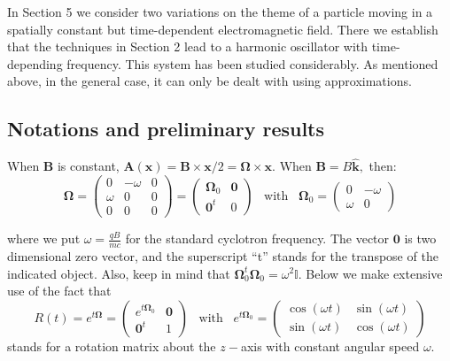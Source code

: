 \documentclass[12pt]{article}
\numberwithin{equation}{section}
\newcommand{\bOm}{{\boldsymbol \Omega}}
\def\b1{{\mathbf 1}}
\def\b0{{\mathbf 0}}
\def\bA{{\boldsymbol A}}
\def\bB{{\boldsymbol B}}
\def\bk{{\boldsymbol k}}
\def\bx{{\boldsymbol x}}
\def\bbI{{\mathbb I}}
\begin{document}
 In Section 5 we consider two variations on the theme of a particle moving in a spatially constant but time-dependent electromagnetic field.  There we establish that the techniques in Section 2 lead to a harmonic oscillator with time-depending frequency. This system has been studied considerably.  As mentioned above, in the general case, it can only be dealt with using approximations.

\subsection{Notations and preliminary results}
When $\bB$ is constant, $\bA(\bx)=\bB\times\bx/2 =\bOm\times\bx.$  When $\bB=B\hat{\bk},$  then:
\begin{equation}\label{ang1}
\bOm = \begin{pmatrix}0 & -\omega &0 \\
                \omega & 0 & 0\\
								0 & 0 & 0
				\end{pmatrix} = \begin{pmatrix} \bOm_0 & \b0\\	
			\b0^t & 0\end{pmatrix}\;\;\;\mbox{with}\;\;\;\bOm_0=\begin{pmatrix} 0 & -\omega\\
				                                 \omega & 0\end{pmatrix}
\end{equation}	
			
where we put $\omega=\frac{qB}{mc}$ for the standard cyclotron frequency. The vector $\b0$ is two dimensional zero vector, and the superscript ``t'' stands for the transpose of the indicated object. Also, keep in mind that $\bOm_0^t\bOm_0=\omega^2\bbI.$ Below we make extensive use of the fact that
\begin{equation}\label{rot1}
R(t) = e^{t\bOm} = \begin{pmatrix}e^{t \bOm_0} & \b0\\	
			\b0^t & 1\end{pmatrix}\;\;\;\mbox{with}\;\;\;
			e^{t\bOm_0}=\begin{pmatrix} \cos(\omega t) & \sin(\omega t)\\
				                                \sin(\omega t) & \cos(\omega t)\end{pmatrix}
\end{equation}
stands for a rotation matrix about the $z-$axis with constant angular speed $\omega.$
\end{document}
